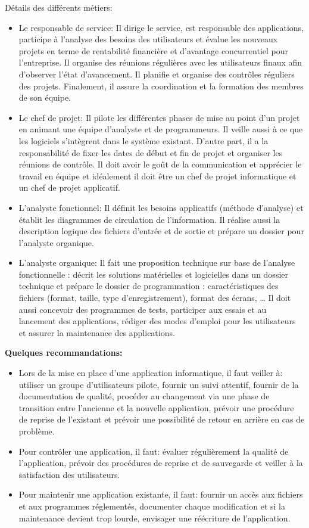 \documentclass[10pt,a4paper,oneside,titlepage]{report}
\begin{document}
Détails des différents métiers:
\begin{itemize}
\item Le responsable de service: Il dirige le service, est responsable des
applications, participe à l’analyse des besoins des utilisateurs et évalue les
nouveaux projets en terme de rentabilité financière et d’avantage concurrentiel
pour l’entreprise. Il organise des réunions régulières avec les utilisateurs
finaux afin d'observer l'état d’avancement. Il planifie et organise des
contrôles réguliers des projets. Finalement, il assure la coordination et
la formation des membres de son équipe.
\item Le chef de projet: Il pilote les différentes phases de mise au point d’un
projet en animant une équipe d’analyste et de programmeurs. Il veille aussi à ce
que les logiciels s’intègrent dans le système existant. D'autre part, il a la
responsabilité de fixer les dates de début et fin de projet et organiser les
réunions de contrôle. Il doit avoir le goût de la communication et apprécier le
travail en équipe et idéalement il doit être un chef de projet informatique et
un chef de projet applicatif.
\item L'analyste fonctionnel: Il définit les besoins applicatifs
(méthode d’analyse) et établit les diagrammes de circulation de l’information.
Il réalise aussi la description logique des fichiers d’entrée et de sortie et
prépare un dossier pour l’analyste organique.
\item L'analyste organique: Il fait une proposition technique sur base de
l’analyse fonctionnelle : décrit les solutions matérielles et logicielles dans
un dossier technique et prépare le dossier de programmation : caractéristiques
des fichiers (format, taille, type d’enregistrement), format des écrans, \dots
Il doit aussi concevoir des programmes de tests, participer aux essais et au
lancement des applications, rédiger des modes d'emploi pour les utilisateurs
et assurer la maintenance des applications.\\
\end{itemize}

\textbf{Quelques recommandations:}
\begin{itemize}
\item Lors de la mise en place d'une application informatique, il faut veiller
à: utiliser un groupe d'utilisateurs pilote, fournir un suivi attentif, fournir
de la documentation de qualité, procéder au changement via une phase de
transition entre l'ancienne et la nouvelle application, prévoir une procédure
de reprise de l'existant et prévoir une possibilité de retour en arrière en cas
de problème.
\item Pour contrôler une application, il faut: évaluer régulièrement la qualité
de l’application, prévoir des procédures de reprise et de sauvegarde et veiller
à la satisfaction des utilisateurs.
\item Pour maintenir une application existante, il faut: fournir un accès aux
fichiers et aux programmes réglementés, documenter chaque modification et si
la maintenance devient trop lourde, envisager une réécriture de l'application.
\end{itemize}
\end{document}
